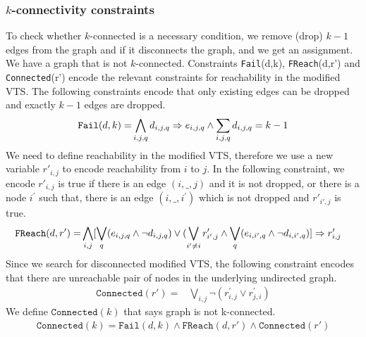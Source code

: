 \subsubsection{$k$-connectivity constraints}
To check whether $k$-connected is a necessary condition, we remove (drop) $k-1$ edges from the graph and if it
disconnects the graph, and we get an assignment. We have a graph that is not  $k$-connected.
%
Constraints \texttt{Fail}(d,k), \texttt{FReach}(d,r') and \texttt{Connected}(r')
encode the relevant constraints for reachability
in the modified VTS. 
%
The following constraints encode that only
existing edges can be dropped and exactly $k-1$ edges are dropped.
\begin{align*}
\texttt{Fail}(d,k) = & 
\bigwedge\limits_{i,j,q} d_{i,j,q} \Rightarrow e_{i,j,q}  \land 
\sum_{i,j,q} d_{i,j,q} = k-1\\
\end{align*}
We need to define reachability in the modified VTS, therefore we use
a new variable $r'_{i,j}$ to encode reachability from $i$ to $j$.
In the following constraint, we encode $r'_{i,j}$ is true if there is an
edge $(i,\_,j)$ and it is not dropped, or there is a node
$i^{\prime}$ such that, there is an edge $(i,\_,i^{\prime})$ which is
not dropped and $r'_{i',j}$ is true.
\begin{align*}
\texttt{FReach}(d,r') = &  \bigwedge\limits_{i,j}  [\bigvee_{q} (e_{i,j,q} \land  \neg d_{i,j,q}) \lor  (\bigvee_{i' \neq i}  r^{\prime}_{i',j} \land  \bigvee_{q} (e_{i,i',q} \land \neg d_{i,i',q}) ] \Rightarrow r^{\prime}_{i,j}  
\end{align*}
Since we search for disconnected modified VTS,
the following constraint encodes that there are 
unreachable pair of nodes in the underlying undirected graph.
\begin{align*}
   \texttt{Connected}(r')  = & \bigvee\limits_{i,j} \neg (r^{\prime}_{i,j} \lor r^{\prime}_{j,i})
\end{align*}
We define $\texttt{Connected}(k)$ that says graph is not k-connected.
\begin{align*}
\texttt{Connected}(k) = \texttt{Fail}(d,k) \land \texttt{FReach}(d,r') \land \texttt{Connected}(r') 
\end{align*}


